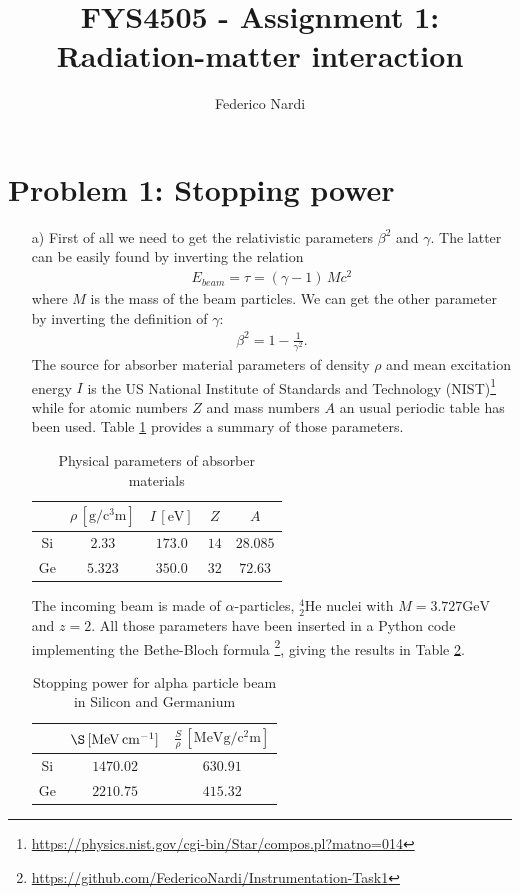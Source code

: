 \documentclass[10pt,a4paper]{article}
\title{FYS4505 - Assignment 1: Radiation-matter interaction}
\author{Federico Nardi}
\date{\vspace{-5ex}}
\begin{document}
\maketitle


\section*{Problem 1: Stopping power}

\begin{enumerate}

\item[a)] First of all we need to get the relativistic parameters $\beta^2$ and $\gamma$. The latter can be easily found by inverting the relation
\begin{align*}
E_{beam} = \tau = (\gamma - 1 )\,M c^2
\end{align*}
where $M$ is the mass of the beam particles. We can get the other parameter by inverting the definition of $\gamma$:
\begin{align*}
\beta^2 = 1 - \frac{1}{\gamma^2}.
\end{align*} 
The source for absorber material parameters of density $\rho$ and mean excitation energy $I$ is the US National Institute of Standards and Technology (NIST)\footnote{\url{https://physics.nist.gov/cgi-bin/Star/compos.pl?matno=014}} while for atomic numbers $Z$ and mass numbers $A$ an usual periodic table has been used. Table \ref{tab:absorbers} provides a summary of those parameters.
\begin{table}[!ht]
\centering
\begin{tabular}{ccccc}
\toprule
  & $\rho\,[\si{\gram\per\cubic\centi\meter}]$ & $I\,[\si{\electronvolt}]$ & $Z$ & $A$ \\
  \midrule
  Si & $2.33$ & $173.0$ & $14$ & $28.085$\\
  Ge & $5.323$ & $350.0$ & $32$ & $72.63$ \\
  \bottomrule
\end{tabular}
\caption{Physical parameters of absorber materials}
\label{tab:absorbers}
\end{table}
The incoming beam is made of $\alpha$-particles, $^4_2$He nuclei with $M=3.727\si{\giga\electronvolt}$ and $z=2$. 
All those parameters have been inserted in a Python code implementing the Bethe-Bloch formula \footnote{\url{https://github.com/FedericoNardi/Instrumentation-Task1}}, giving the results in Table \ref{tab:alphabeam}.\
\begin{table}[!ht]
\centering
\begin{tabular}{ccc}
\toprule
  & $\S\,[\si{\mega\electronvolt\per\centi\meter}]$ & $\frac{S}{\rho}\,[\si{\mega\electronvolt\gram\per\square\centi\meter}]$\\
  \midrule
  Si & $1470.02$ & $630.91$ \\
  Ge & $2210.75$ & $415.32$\\
  \bottomrule
\end{tabular}
\caption{Stopping power for alpha particle beam in Silicon and Germanium}
\label{tab:alphabeam}
\end{table}


\end{enumerate}
\end{document}
